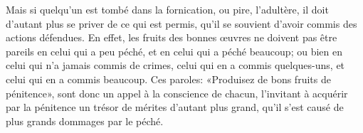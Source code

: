 Mais si quelqu’un est tombé dans la fornication, ou pire, l’adultère,
	il doit d’autant plus se priver de ce qui est permis,
	qu’il se souvient d’avoir commis des actions défendues.
En effet, les fruits des bonnes œuvres ne doivent pas être pareils
	en celui qui a peu péché, et en celui qui a péché beaucoup;
	ou bien en celui qui n’a jamais commis de crimes,
	celui qui en a commis quelques-uns, et celui qui en a commis beaucoup.
Ces paroles: «Produisez de bons fruits de pénitence»,
	sont donc un appel à la conscience de chacun,
	l’invitant à acquérir par la pénitence
		un trésor de mérites d’autant plus grand,
	qu’il s’est causé de plus grands dommages par le péché.
